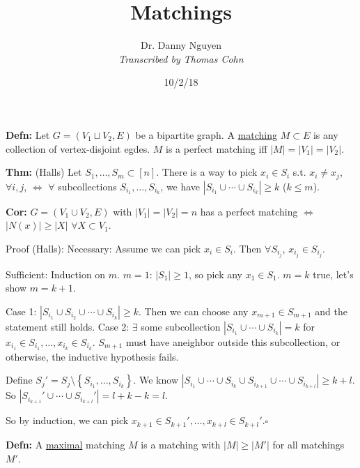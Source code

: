 \documentclass[10pt,letterpaper]{article}
\author{Dr. Danny Nguyen\\ \small\textit{Transcribed by Thomas Cohn}}
\title{Matchings}
\date{10/2/18} %
\newcommand{\n}{\hfill\break}
\newcommand{\defn}[1]{\par\noindent\settowidth{\hangindent}{\textbf{Defn: }}\textbf{Defn: }#1\n}
\newcommand{\thm}[1]{\par\noindent\settowidth{\hangindent}{\textbf{Thm: }}\textbf{Thm: }#1\n}
\newcommand{\cor}[1]{\par\noindent\settowidth{\hangindent}{\textbf{Cor: }}\textbf{Cor: }#1\n}
\newcommand{\proven}{\;$\square$\n}
\newcommand{\card}[1]{\left|#1\right|}
\newcommand{\set}[1]{\left\{#1\right\}}
\newcommand{\st}{s.t.}
\begin{document}
\maketitle
\setlength\RaggedRightParindent{\parindent}
\RaggedRight

\defn{Let $G=(V_{1}\sqcup{}V_{2},E)$ be a bipartite graph. A \underline{matching} $M\subset{}E$ is any collection of vertex-disjoint egdes. $M$ is a perfect matching iff $\card{M}=\card{V_{1}}=\card{V_{2}}$.}

\thm{(Halls) Let $S_{1},\ldots,S_{m}\subset[n]$. There is a way to pick $x_{i}\in{}S_{i}$ \st{} $x_{i}\ne{}x_{j}$, $\forall{}i,j$, $\Leftrightarrow$ $\forall$ subcollections $S_{i_{1}},\ldots,S_{i_{k}}$, we have $\card{S_{i_{1}}\cup\cdots\cup{}S_{i_{k}}}\ge{}k$ ($k\le{}m$).}

\cor{$G=(V_{1}\cup{}V_{2},E)$ with $\card{V_{1}}=\card{V_{2}}=n$ has a perfect matching $\Leftrightarrow$ $\card{N(x)}\ge\card{X}$ $\forall{}X\subset{}V_{1}$.}

\par\noindent Proof (Halls):\n
Necessary: Assume we can pick $x_{i}\in{}S_{i}$. Then $\forall{}S_{i_{j}}$, $x_{i_{j}}\in{}S_{i_{j}}$.\n

\par\noindent Sufficient: Induction on $m$.\n
$m=1$: $\card{S_{1}}\ge{}1$, so pick any $x_{1}\in{}S_{1}$.\n
$m=k$ true, let's show $m=k+1$.\n

\par\noindent Case 1: $\card{S_{i_{1}}\cup{}S_{i_{2}}\cup\cdots\cup{}S_{i_{k}}}\ge{}k$. Then we can choose any $x_{m+1}\in{}S_{m+1}$ and the statement still holds.\n
Case 2: $\exists$ some subcollection $\card{S_{i_{1}}\cup\cdots\cup{}S_{i_{k}}}=k$ for $x_{i_{1}}\in{}S_{i_{1}},\ldots,x_{i_{k}}\in{}S_{i_{k}}$. $S_{m+1}$ must have  aneighbor outside this subcollection, or otherwise, the inductive hypothesis fails.\n

\par\noindent Define $S_{j}'=S_{j}\setminus\set{S_{i_{1}},\ldots,S_{i_{k}}}$. We know $\card{S_{i_{1}}\cup\cdots\cup{}S_{i_{k}}\cup{}S_{i_{k+1}}\cup\cdots\cup{}S_{i_{k+l}}}\ge{}k+l$. So $\card{S_{i_{k+1}}'\cup\cdots\cup{}S_{i_{k+l}}'}=l+k-k=l$.\n

\par\noindent So by induction, we can pick $x_{k+1}\in{}S_{k+1}',\ldots,x_{k+l}\in{}S_{k+l}'$.\proven

\defn{A \underline{maximal} matching $M$ is a matching with $\card{M}\ge\card{M'}$ for all matchings $M'$.}
\end{document}
